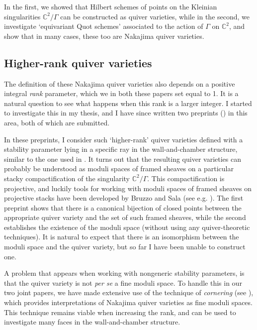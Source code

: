 \documentclass[11pt,a4paper ]{article}        %
\newcommand{\C}{\mathbb{C}}    						%
\begin{document}

In the first, we showed that Hilbert schemes of points on the Kleinian singularities $ \C^2/\Gamma $ can be constructed as quiver varieties, while in the second, we investigate `equivariant Quot schemes' associated to the action of $ \Gamma $ on $ \C^2 $, and show that in many cases, these too are Nakajima quiver varieties.%

\subsection*{Higher-rank quiver varieties}
The definition of these Nakajima quiver varieties also depends on a positive integral \emph{rank} parameter, which we in both these papers set equal to 1. It is a natural question to see what happens when this rank is a larger integer. I started to investigate this in my thesis, and I have since written two preprints (\cite{GG2, GG1}) in this area, both of which are submitted.

In these preprints, I consider such `higher-rank' quiver varieties defined with a stability parameter lying in a specific ray in the wall-and-chamber structure, similar to the one used in \cite{CGGS}. It turns out that the resulting quiver varieties can probably be understood as moduli spaces of framed sheaves on a particular stacky compactification of the singularity $ \C^2/\Gamma $. This compactification is projective, and luckily tools for working with moduli spaces of framed sheaves on projective stacks have been developed by Bruzzo and Sala (see e.g. \cite{BruzzoSala}). The first preprint shows that there is a canonical bijection of closed points between the appropriate quiver variety and the set of such framed sheaves, while the second establishes the existence of the moduli space (without using any quiver-theoretic techniques). It is natural to expect that there is an isomorphism between the moduli space and the quiver variety, but so far I have been unable to construct one.%

 A problem that appears when working with nongeneric stability parameters, is that the quiver variety is not \emph{per se} a fine moduli space. To handle this in our two joint papers, we have made extensive use of the technique of \emph{cornering} (see \cite[Remark 3.1]{CIK}), which provides interpretations of Nakajima quiver varieties as fine moduli spaces. This technique remains viable when increasing the rank, and can be used to investigate many faces in the wall-and-chamber structure.
\end{document}
